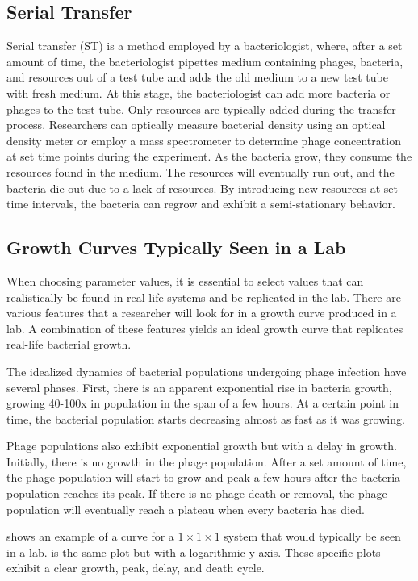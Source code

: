 \subsection{Serial Transfer}
Serial transfer (ST) is a method employed by a bacteriologist, where, after a set amount of time, the bacteriologist pipettes medium containing phages, bacteria, and resources out of a test tube and adds the old medium to a new test tube with fresh medium.
At this stage, the bacteriologist can add more bacteria or phages to the test tube. 
Only resources are typically added during the transfer process. 
Researchers can optically measure bacterial density using an optical density meter or employ a mass spectrometer to determine phage concentration at set time points during the experiment. 
As the bacteria grow, they consume the resources found in the medium.
The resources will eventually run out, and the bacteria die out due to a lack of resources.
By introducing new resources at set time intervals, the bacteria can regrow and exhibit a semi-stationary behavior.

\subsection{Growth Curves Typically Seen in a Lab}
\label{sec:literaturereview:growth_curves_typically_seen_in_a_lab}
When choosing parameter values, it is essential to select values that can realistically be found in real-life systems and be replicated in the lab. 
There are various features that a researcher will look for in a growth curve produced in a lab.
A combination of these features yields an ideal growth curve that replicates real-life bacterial growth. 

The idealized dynamics of bacterial populations undergoing phage infection have several phases. 
First, there is an apparent exponential rise in bacteria growth, growing 40-100x in population in the span of a few hours. 
At a certain point in time, the bacterial population starts decreasing almost as fast as it was growing. 

Phage populations also exhibit exponential growth but with a delay in growth. 
Initially, there is no growth in the phage population. 
After a set amount of time, the phage population will start to grow and peak a few hours after the bacteria population reaches its peak. 
If there is no phage death or removal, the phage population will eventually reach a plateau when every bacteria has died. 

 shows an example of a curve for a $1\times1\times1$ system that would typically be seen in a lab. 
 is the same plot but with a logarithmic y-axis. 
These specific plots exhibit a clear growth, peak, delay, and death cycle. 

